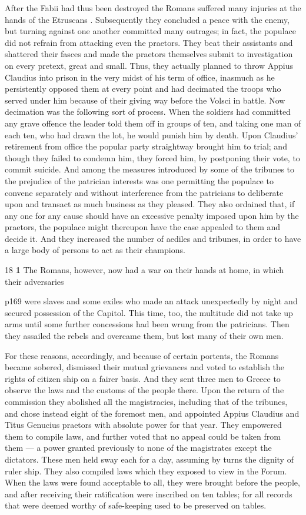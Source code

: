 After the Fabii had thus been destroyed the Romans suffered many injuries at the hands of the Etruscans . Subsequently they concluded a peace with the enemy, but turning against one another committed many outrages; in fact, the populace did not refrain from attacking even the praetors. They beat their assistants and shattered their fasces and made the praetors themselves submit to investigation on every pretext, great and small. Thus, they actually planned to throw Appius Claudius into prison in the very midst of his term of office, inasmuch as he persistently opposed them at every point and had decimated the troops who served under him because of their giving way before the Volsci in battle. Now decimation was the following sort of process. When the soldiers had committed any grave offence the leader told them off in groups of ten, and taking one man of each ten, who had drawn the lot, he would punish him by death. Upon Claudius' retirement from office the popular party straightway brought him to trial; and though they failed to condemn him, they forced him, by postponing their vote, to commit suicide. And among the measures introduced by some of the tribunes to the prejudice of the patrician interests was one permitting the populace to convene separately and without interference from the patricians to deliberate upon and transact as much business as they pleased. They also ordained that, if any one for any cause should have an excessive penalty imposed upon him by the praetors, the populace might thereupon have the case appealed to them and decide it. And they increased the number of aediles and tribunes, in order to have a large body of persons to act as their champions.

18
\textbf{1} The Romans, however, now had a war on their hands at home, in which their adversaries

p169 were slaves and some exiles who made an attack unexpectedly by night and secured possession of the Capitol. This time, too, the multitude did not take up arms until some further concessions had been wrung from the patricians. Then they assailed the rebels and overcame them, but lost many of their own men.

For these reasons, accordingly, and because of certain portents, the Romans became sobered, dismissed their mutual grievances and voted to establish the rights of citizen ­ship on a fairer basis. And they sent three men to Greece to observe the laws and the customs of the people there. Upon the return of the commission they abolished all the magistracies, including that of the tribunes, and chose instead eight of the foremost men, and appointed Appius Claudius and Titus Genucius praetors with absolute power for that year. They empowered them to compile laws, and further voted that no appeal could be taken from them \texthebrew{—} a power granted previously to none of the magistrates except the dictators. These men held sway each for a day, assuming by turns the dignity of ruler ­ship. They also compiled laws which they exposed to view in the Forum. When the laws were found acceptable to all, they were brought before the people, and after receiving their ratification were inscribed on ten tables; for all records that were deemed worthy of safe-keeping used to be preserved on tables.

